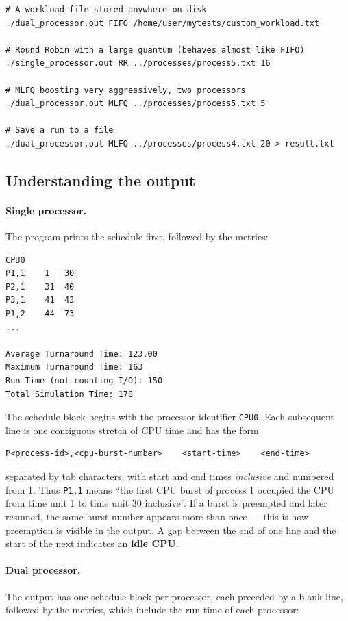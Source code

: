 \documentclass[11pt,a4paper]{article}
\begin{document}
\begin{lstlisting}
# A workload file stored anywhere on disk
./dual_processor.out FIFO /home/user/mytests/custom_workload.txt

# Round Robin with a large quantum (behaves almost like FIFO)
./single_processor.out RR ../processes/process5.txt 16

# MLFQ boosting very aggressively, two processors
./dual_processor.out MLFQ ../processes/process5.txt 5

# Save a run to a file
./dual_processor.out MLFQ ../processes/process4.txt 20 > result.txt
\end{lstlisting}

\subsection{Understanding the output}

\paragraph{Single processor.} The program prints the schedule first, followed by the
metrics:

\begin{lstlisting}
CPU0
P1,1	1	30
P2,1	31	40
P3,1	41	43
P1,2	44	73
...

Average Turnaround Time: 123.00
Maximum Turnaround Time: 163
Run Time (not counting I/O): 150
Total Simulation Time: 178
\end{lstlisting}

The schedule block begins with the processor identifier \texttt{CPU0}. Each subsequent line
is one contiguous stretch of CPU time and has the form

\begin{lstlisting}
P<process-id>,<cpu-burst-number>	<start-time>	<end-time>
\end{lstlisting}

separated by tab characters, with start and end times \emph{inclusive} and numbered from 1.
Thus \texttt{P1,1} means ``the first CPU burst of process 1 occupied the CPU
from time unit 1 to time unit 30 inclusive''. If a burst is preempted and later resumed, the
same burst number appears more than once --- this is how preemption is visible in the
output. A gap between the end of one line and the start of the next indicates an
\textbf{idle CPU}.

\paragraph{Dual processor.} The output has one schedule block per processor, each preceded
by a blank line, followed by the metrics, which include the run time of each processor:
\end{document}
